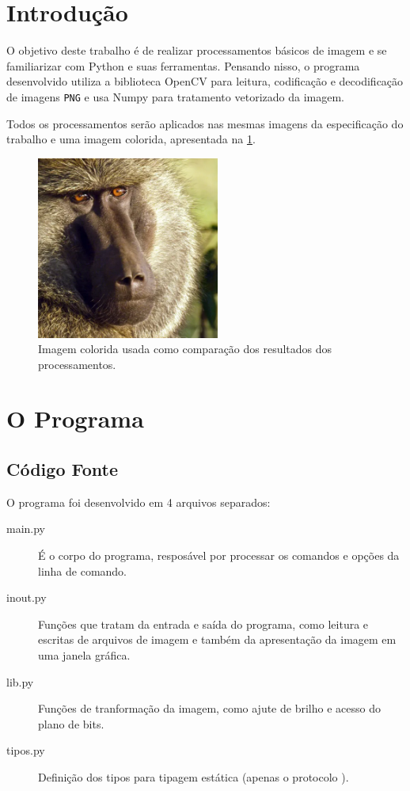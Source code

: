 \documentclass[assignment = 0]{homework}
\begin{document}
    \section{Introdução}

    O objetivo deste trabalho é de realizar processamentos básicos de imagem e se familiarizar com Python e suas ferramentas. Pensando nisso, o programa desenvolvido utiliza a biblioteca OpenCV para leitura, codificação e decodificação de imagens \texttt{PNG} e usa Numpy para tratamento vetorizado da imagem.

    Todos os processamentos serão aplicados nas mesmas imagens da especificação do trabalho e uma imagem colorida, apresentada na \cref{fig:color}.

    \begin{figure}[H]
        \centering
        \includegraphics[width=6cm]{imagens/color.png}

        \caption{Imagem colorida usada como comparação dos resultados dos processamentos.}
        \label{fig:color}
    \end{figure}

    \section{O Programa}

    \subsection{Código Fonte}

    O programa foi desenvolvido em 4 arquivos separados:

    \begin{description}
        \item[main.py] É o corpo do programa, resposável por processar os comandos e opções da linha de comando.

        \item[inout.py] Funções que tratam da entrada e saída do programa, como leitura e escritas de arquivos de imagem e também da apresentação da imagem em uma janela gráfica.

        \item[lib.py] Funções de tranformação da imagem, como ajute de brilho e acesso do plano de bits.

        \item[tipos.py] Definição dos tipos para tipagem estática (apenas o protocolo \autocite{ref:pep544} ).
    \end{description}
\end{document}
